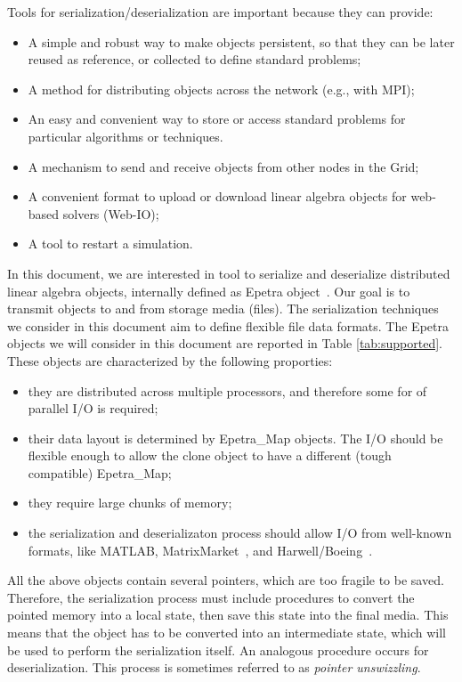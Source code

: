 \documentclass[11pt,relax]{SANDreport}
\begin{document}
Tools for serialization/deserialization are important because they can
provide:
\begin{itemize}
\item A simple and robust way to make objects persistent, so that they can be
later reused as reference, or collected to define standard problems;
\item A method for distributing objects across the network (e.g., with MPI);
\item An easy and convenient way to store or access standard problems for particular algorithms or techniques. 
\item A mechanism to send and receive objects from other nodes in the Grid;
\item A convenient format to upload or download linear algebra objects for
web-based solvers (Web-IO);
\item A tool to restart a simulation.
\end{itemize}
In this document, we are interested in tool to serialize and deserialize
distributed linear algebra objects, internally defined as Epetra
object~\cite{Epetra-Users-Guide}. Our goal is to transmit objects to and from
storage media (files).
The serialization techniques we consider in
this document aim to define flexible file data formats. The Epetra objects we
will consider in this document are reported in Table \ref{tab:supported}.
These objects are characterized by the
following proporties:
\begin{itemize}
\item they are distributed across multiple processors, and therefore some for
of parallel I/O is required;
\item their data layout is determined by Epetra\_Map objects. The I/O should
be flexible enough to allow the clone object to have a different (tough
                                                                  compatible)
Epetra\_Map;
\item they require large chunks of memory;
\item the serialization and deserializaton process should allow I/O from
well-known formats, like MATLAB, MatrixMarket~\cite{boisvert97matrix}, and
Harwell/Boeing~\cite{duff89sparse}.
\end{itemize}
All the above objects
contain several pointers, which are too fragile to be saved. Therefore,
        the serialization process
must include procedures to convert the pointed memory into a local state, then
save this state into the final media. This means that the object has to be
converted into an intermediate state, which will be used to perform the
serialization itself. An analogous procedure occurs for deserialization. This
process is sometimes referred to as {\sl pointer unswizzling}.
\end{document}
